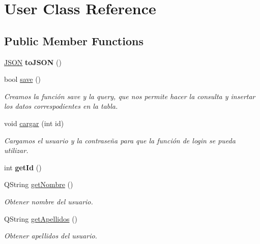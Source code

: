 \hypertarget{classUser}{}\section{User Class Reference}
\label{classUser}
\subsection*{Public Member Functions}
\begin{DoxyCompactItemize}
\item 
\mbox{\label{classUser_a51c195730a744a33925ca27ee620d92a}} 
\mbox{\hyperlink{classnlohmann_1_1basic__json}{J\+S\+ON}} {\bfseries to\+J\+S\+ON} ()
\item 
bool \mbox{\hyperlink{classUser_a6bc3635e377a3d934379add410fcf9c0}{save}} ()
\begin{DoxyCompactList}\small\item\em Creamos la función save y la query, que nos permite hacer la consulta y insertar los datos correspodientes en la tabla. \end{DoxyCompactList}\item 
void \mbox{\hyperlink{classUser_a3d1f98d7ddb605391b6d2220747c2bd5}{cargar}} (int id)
\begin{DoxyCompactList}\small\item\em Cargamos el usuario y la contraseña para que la función de login se pueda utilizar. \end{DoxyCompactList}\item 
\mbox{\label{classUser_a1e393732cd9838ab29445d9153333046}} 
int {\bfseries get\+Id} ()
\item 
Q\+String \mbox{\hyperlink{classUser_a3cc589543a052946a1255135f855b61f}{get\+Nombre}} ()
\begin{DoxyCompactList}\small\item\em Obtener nombre del usuario. \end{DoxyCompactList}\item 
Q\+String \mbox{\hyperlink{classUser_abe1cf0f201fe92b0d0f4540689477bd4}{get\+Apellidos}} ()
\begin{DoxyCompactList}\small\item\em Obtener apellidos del usuario. \end{DoxyCompactList}\item 
\mbox{\label{classUser_ad6ef2b0be0450bdc6ac2c01ed7c8d9ca}} 

\end{DoxyCompactItemize}
